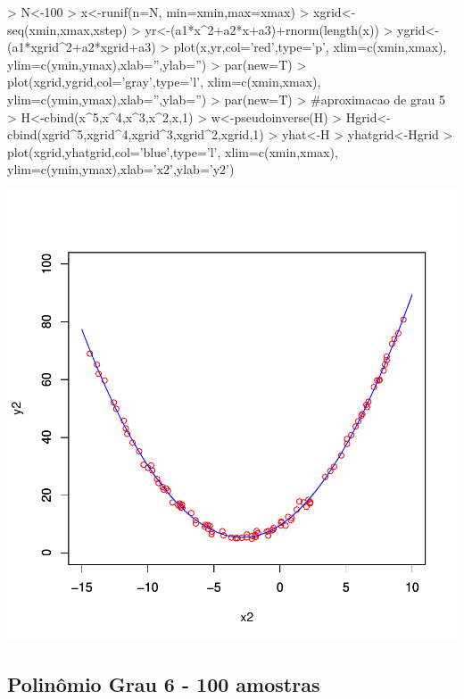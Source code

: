 \documentclass{article}
\begin{document}
\begin{Schunk}
\begin{Sinput}
>   N<-100
>   x<-runif(n=N, min=xmin,max=xmax)
>   xgrid<-seq(xmin,xmax,xstep)
>   yr<-(a1*x^2+a2*x+a3)+rnorm(length(x))
>   ygrid<-(a1*xgrid^2+a2*xgrid+a3)
>   plot(x,yr,col='red',type='p', xlim=c(xmin,xmax), ylim=c(ymin,ymax),xlab='',ylab='')
>   par(new=T)
>   plot(xgrid,ygrid,col='gray',type='l', xlim=c(xmin,xmax), ylim=c(ymin,ymax),xlab='',ylab='')
>   par(new=T)
>   #aproximacao de grau 5
>   H<-cbind(x^5,x^4,x^3,x^2,x,1)
>   w<-pseudoinverse(H) %
>   Hgrid<-cbind(xgrid^5,xgrid^4,xgrid^3,xgrid^2,xgrid,1)
>   yhat<-H%
>   yhatgrid<-Hgrid%
>   plot(xgrid,yhatgrid,col='blue',type='l', xlim=c(xmin,xmax), ylim=c(ymin,ymax),xlab='x2',ylab='y2')
\end{Sinput}
\end{Schunk}
\includegraphics{aproximacao_polinomial-014}

\newpage
\subsection{Polinômio Grau 6 - 100 amostras}
\end{document}
